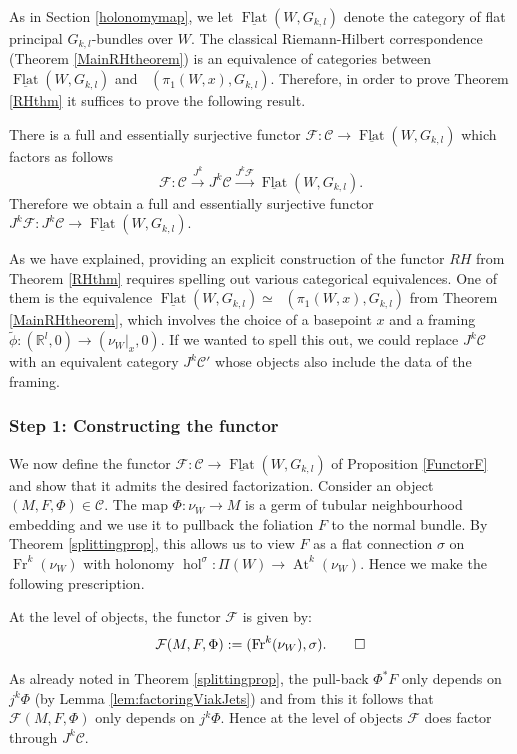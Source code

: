\documentclass[10pt]{amsart}
\newcommand{\F}{{\mathcal{F}}}
\newcommand{\RR}{\mathbb{R}}
\newcommand{\hol}{{\operatorname{hol}}}
\newcommand{\FlatCat}{{\underline{\operatorname{Flat}}}}
\DeclareMathOperator{\Rep}{\underline{\operatorname{Rep}}}
\newcommand{\Fr}{{\operatorname{Fr}}}
\newcommand{\C}{\mathcal{C}}
\DeclareMathOperator{\At}{At}
\numberwithin{theoremalpha}{section}
\numberwithin{equation}{section}
\numberwithin{definition}{section}
\numberwithin{theorem}{section}
\numberwithin{proposition}{section}
\numberwithin{lemma}{section}
\numberwithin{example}{section}
\numberwithin{remark}{section}
\numberwithin{corollary}{section}
\numberwithin{question}{section}
\numberwithin{problem}{section}
\numberwithin{assumption}{section}
\theoremstyle{named}
\numberwithin{equation}{section}
\begin{document}
As in Section \ref{holonomymap}, we let $\FlatCat(W,G_{k,l})$ denote the category of flat principal $G_{k,l}$-bundles over $W$. The classical Riemann-Hilbert correspondence (Theorem \ref{MainRHtheorem}) is an equivalence of categories between $\FlatCat(W,G_{k,l})$ and $\Rep(\pi_{1}(W, x), G_{k,l})$. Therefore, in order to prove Theorem \ref{RHthm} it suffices to prove the following result. 

\begin{proposition}  \label{FunctorF}
There is a full and essentially surjective functor $\F: \mathcal{C} \to \FlatCat(W,G_{k,l})$ which factors as follows 
\[
\F: \mathcal{C} \xrightarrow{J^k} J^k\C \xrightarrow{J^k\F} \FlatCat(W,G_{k,l}).
\]
Therefore we obtain a full and essentially surjective functor $J^k\F: J^k\mathcal{C} \to \FlatCat(W,G_{k,l})$.
\end{proposition}

\begin{remark} \label{explicitRHconstruction}
As we have explained, providing an explicit construction of the functor $RH$ from Theorem \ref{RHthm} requires spelling out various categorical equivalences. One of them is the equivalence $\FlatCat(W,G_{k,l}) \simeq \Rep(\pi_1(W,x),G_{k,l})$ from Theorem \ref{MainRHtheorem}, which involves the choice of a basepoint $x$ and a framing $\tilde{\phi}: (\RR^l, 0) \to (\nu_{W}|_{x}, 0)$. If we wanted to spell this out, we could replace $J^k\mathcal{C}$ with an equivalent category $J^k\mathcal{C}'$ whose objects also include the data of the framing. \end{remark}

\subsubsection{Step 1: Constructing the functor} \label{tediousconstruction}

We now define the functor $\F: \mathcal{C} \to \FlatCat(W, G_{k,l})$ of Proposition \ref{FunctorF} and show that it admits the desired factorization. Consider an object $(M, F, \Phi) \in \mathcal{C}$. The map $\Phi : \nu_{W} \to M$ is a germ of tubular neighbourhood embedding and we use it to pullback the foliation $F$ to the normal bundle. By Theorem \ref{splittingprop}, this allows us to view $F$ as a flat connection $\sigma$ on $\Fr^{k}(\nu_{W})$ with holonomy $\hol^{\sigma} : \Pi(W) \to \At^{k}(\nu_{W})$. Hence we make the following prescription. 
\begin{definition}
At the level of objects, the functor $\F$ is given by:
\[ \F(M, F, \Phi) := (\Fr^{k}(\nu_{W}), \sigma). \hfill \qedhere \]
\end{definition}
As already noted in Theorem \ref{splittingprop}, the pull-back $\Phi^*F$ only depends on $j^k\Phi$ (by Lemma \ref{lem:factoringViakJets}) and from this it follows that $\F(M, F, \Phi)$ only depends on $j^k\Phi$. Hence at the level of objects $\F$ does factor through $J^k\mathcal{C}$.
\end{document}
